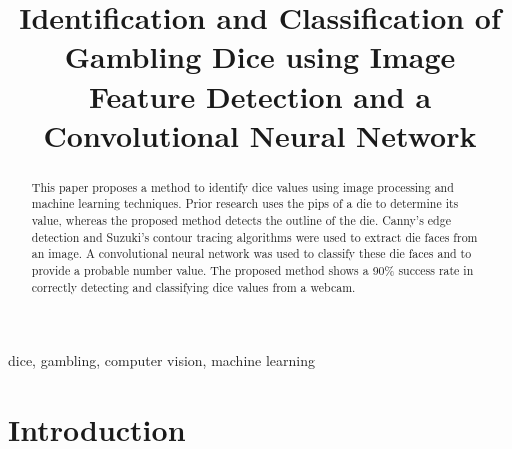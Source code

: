 \documentclass[conference]{IEEEtran}
\begin{document}
\title{
	Identification and Classification of Gambling Dice using Image Feature Detection and a Convolutional Neural Network
}

\author{
	\and
}

\maketitle

\begin{abstract}
	This paper proposes a method to identify dice values using image processing and machine learning techniques.
	Prior research uses the pips of a die to determine its value, whereas the proposed method detects the outline of the die.
	Canny's edge detection and Suzuki's contour tracing algorithms were used to extract die faces from an image.
	A convolutional neural network was used to classify these die faces and to provide a probable number value.
	The proposed method shows a 90\% success rate in correctly detecting and classifying dice values from a webcam.
\end{abstract}

\begin{IEEEkeywords}
	dice, gambling, computer vision, machine learning
\end{IEEEkeywords}

\section{Introduction}
\end{document}
